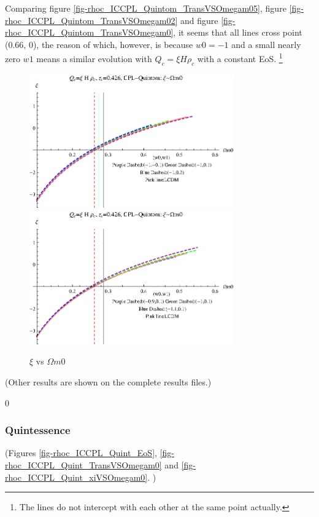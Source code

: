 \documentclass[12pt,a4paper]{article}
\begin{document}
Comparing figure \ref{fig-rhoc_ICCPL_Quintom_TransVSOmegam05}, figure \ref{fig-rhoc_ICCPL_Quintom_TransVSOmegam02} and figure \ref{fig-rhoc_ICCPL_Quintom_TransVSOmegam0}, it seems that all lines cross point (0.66, 0), the reason of which, however, is because $w0=-1$ and a small nearly zero $w1$ means a similar evolution with $Q_c=\xi H\rho_c$ with a constant EoS. \footnote{The lines do not intercept with each other at the same point actually.}

\begin{figure}
\centering
\includegraphics[width=250pt]{rhoc_ICCPL_Quintom_xiVSOmegam01.eps}
\includegraphics[width=250pt]{rhoc_ICCPL_Quintom_xiVSOmegam02.eps}
\caption{$\xi$ vs $\Omega m0$}\label{fig-rhoc_ICCPL_Quintom_xiVSOmegam0}
\end{figure}



(Other results are shown on the complete results files.)



0
\subsubsection{Quintessence}

(Figures \ref{fig-rhoc_ICCPL_Quint_EoS}, \ref{fig-rhoc_ICCPL_Quint_TransVSOmegam0} and \ref{fig-rhoc_ICCPL_Quint_xiVSOmegam0}. )
\end{document}
